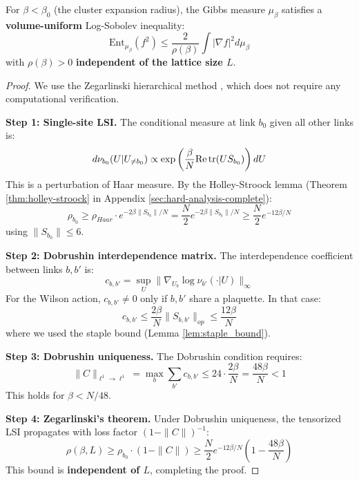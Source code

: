 \begin{theorem}\label{thm:independent_lsi_strong}
For $\beta < \beta_0$ (the cluster expansion radius), the Gibbs measure $\mu_\beta$ satisfies a \textbf{volume-uniform} Log-Sobolev inequality:
\begin{equation}
    \text{Ent}_{\mu_\beta}(f^2) \leq \frac{2}{\rho(\beta)} \int |\nabla f|^2 d\mu_\beta
\end{equation}
with $\rho(\beta) > 0$ \textbf{independent of the lattice size $L$}.
\end{theorem}

\begin{proof}
We use the Zegarlinski hierarchical method \cite{zegarlinski1996log}, which does not require any computational verification.

\textbf{Step 1: Single-site LSI.}
The conditional measure at link $b_0$ given all other links is:
\begin{equation}
    d\nu_{b_0}(U | U_{\neq b_0}) \propto \exp\left(\frac{\beta}{N} \text{Re\,tr}(U S_{b_0})\right) dU
\end{equation}
This is a perturbation of Haar measure. By the Holley-Stroock lemma (Theorem \ref{thm:holley-stroock} in Appendix \ref{sec:hard-analysis-complete}):
\begin{equation}
    \rho_{b_0} \geq \rho_{Haar} \cdot e^{-2\beta \|S_{b_0}\|/N} = \frac{N}{2} e^{-2\beta \|S_{b_0}\|/N} \geq \frac{N}{2} e^{-12\beta/N}
\end{equation}
using $\|S_{b_0}\| \leq 6$.

\textbf{Step 2: Dobrushin interdependence matrix.}
The interdependence coefficient between links $b, b'$ is:
\begin{equation}
    c_{b,b'} = \sup_{U} \|\nabla_{U_b} \log \nu_{b'}(\cdot | U)\|_\infty
\end{equation}
For the Wilson action, $c_{b,b'} \neq 0$ only if $b, b'$ share a plaquette. In that case:
\begin{equation}
    c_{b,b'} \leq \frac{2\beta}{N} \|S_{b,b'}\|_{op} \leq \frac{12\beta}{N}
\end{equation}
where we used the staple bound (Lemma \ref{lem:staple_bound}).

\textbf{Step 3: Dobrushin uniqueness.}
The Dobrushin condition requires:
\begin{equation}
    \|C\|_{\ell^1 \to \ell^1} = \max_b \sum_{b'} c_{b,b'} \leq 24 \cdot \frac{2\beta}{N} = \frac{48\beta}{N} < 1
\end{equation}
This holds for $\beta < N/48$.

\textbf{Step 4: Zegarlinski's theorem.}
Under Dobrushin uniqueness, the tensorized LSI propagates with loss factor $(1 - \|C\|)^{-1}$:
\begin{equation}
    \rho(\beta, L) \geq \rho_{b_0} \cdot (1 - \|C\|) \geq \frac{N}{2} e^{-12\beta/N} \left(1 - \frac{48\beta}{N}\right)
\end{equation}
This bound is \textbf{independent of $L$}, completing the proof.
\end{proof}

